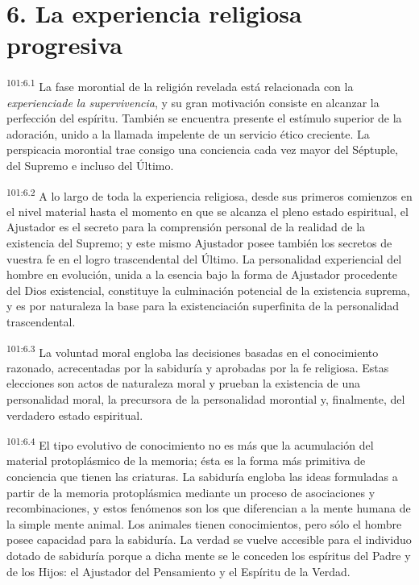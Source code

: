 \documentclass[twoside, 11pt]{book}
\begin{document}
\section*{6. La experiencia religiosa progresiva}
\par
\textsuperscript{101:6.1} La fase morontial de la religión revelada está relacionada con la \textit{experienciade la supervivencia}, y su gran motivación consiste en alcanzar la perfección del espíritu. También se encuentra presente el estímulo superior de la adoración, unido a la llamada impelente de un servicio ético creciente. La perspicacia morontial trae consigo una conciencia cada vez mayor del Séptuple, del Supremo e incluso del Último.

\par
\textsuperscript{101:6.2} A lo largo de toda la experiencia religiosa, desde sus primeros comienzos en el nivel material hasta el momento en que se alcanza el pleno estado espiritual, el Ajustador es el secreto para la comprensión personal de la realidad de la existencia del Supremo; y este mismo Ajustador posee también los secretos de vuestra fe en el logro trascendental del Último. La personalidad experiencial del hombre en evolución, unida a la esencia bajo la forma de Ajustador procedente del Dios existencial, constituye la culminación potencial de la existencia suprema, y es por naturaleza la base para la existenciación superfinita de la personalidad trascendental.

\par
\textsuperscript{101:6.3} La voluntad moral engloba las decisiones basadas en el conocimiento razonado, acrecentadas por la sabiduría y aprobadas por la fe religiosa. Estas elecciones son actos de naturaleza moral y prueban la existencia de una personalidad moral, la precursora de la personalidad morontial y, finalmente, del verdadero estado espiritual.

\par
\textsuperscript{101:6.4} El tipo evolutivo de conocimiento no es más que la acumulación del material protoplásmico de la memoria; ésta es la forma más primitiva de conciencia que tienen las criaturas. La sabiduría engloba las ideas formuladas a partir de la memoria protoplásmica mediante un proceso de asociaciones y recombinaciones, y estos fenómenos son los que diferencian a la mente humana de la simple mente animal. Los animales tienen conocimientos, pero sólo el hombre posee capacidad para la sabiduría. La verdad se vuelve accesible para el individuo dotado de sabiduría porque a dicha mente se le conceden los espíritus del Padre y de los Hijos: el Ajustador del Pensamiento y el Espíritu de la Verdad.
\end{document}
